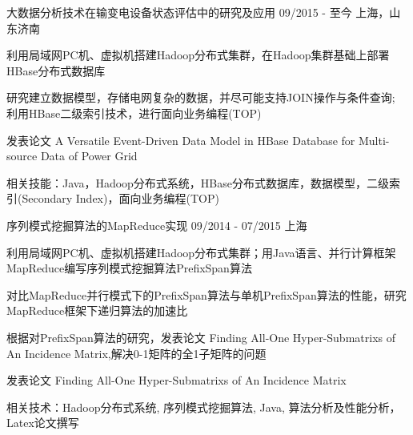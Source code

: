 \begin{cventries}
 \vspace{5pt}
  \cventry
    {} %
    {大数据分析技术在输变电设备状态评估中的研究及应用} %
     {09/2015 - 至今} %
    {上海，山东济南} %
    {
    \vspace{-8pt}
      \begin{cvitems} %
        \item {利用局域网PC机、虚拟机搭建Hadoop分布式集群，在Hadoop集群基础上部署HBase分布式数据库}
        \item {研究建立数据模型，存储电网复杂的数据，并尽可能支持JOIN操作与条件查询; 利用HBase二级索引技术，进行面向业务编程(TOP)}
        \item{发表论文 A Versatile Event-Driven Data Model in HBase Database for Multi-source Data of Power Grid}
        \item{相关技能：Java，Hadoop分布式系统，HBase分布式数据库，数据模型，二级索引(Secondary Index)，面向业务编程(TOP) }
      \end{cvitems}
    }
    
    \vspace{5pt}
    \cventry
    {} %
    {序列模式挖掘算法的MapReduce实现} %
    {09/2014 - 07/2015} %
    {上海} %
    {
    \vspace{-8pt}
      \begin{cvitems} %
        \item {利用局域网PC机、虚拟机搭建Hadoop分布式集群；用Java语言、并行计算框架MapReduce编写序列模式挖掘算法PrefixSpan算法}
        \item {对比MapReduce并行模式下的PrefixSpan算法与单机PrefixSpan算法的性能，研究MapReduce框架下递归算法的加速比}
        \item{根据对PrefixSpan算法的研究，发表论文 Finding All-One Hyper-Submatrixs of An Incidence Matrix,解决0-1矩阵的全1子矩阵的问题 }
	\item{发表论文 Finding All-One Hyper-Submatrixs of An Incidence Matrix}
        \item{相关技术：Hadoop分布式系统, 序列模式挖掘算法, Java, 算法分析及性能分析，Latex论文撰写}
      \end{cvitems}
    }


\end{cventries}
